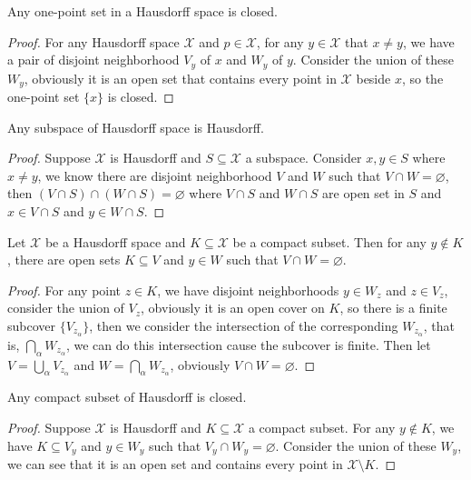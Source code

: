 \documentclass[./main.tex]{subfiles}
\begin{document}
\begin{corollary}
  Any one-point set in a Hausdorff space is closed.
\end{corollary}
\begin{proof}
  For any Hausdorff space $\mathcal{X}$ and $p \in \mathcal{X}$,
  for any $y \in \mathcal{X}$ that $x \neq y$, we have a pair of disjoint neighborhood
  $V_y$ of $x$ and $W_y$ of $y$. Consider the union of these $W_y$,
  obviously it is an open set that contains every point in $\mathcal{X}$ beside $x$,
  so the one-point set $\{ x \}$ is closed.
\end{proof}

\begin{corollary}
  Any subspace of Hausdorff space is Hausdorff.
\end{corollary}
\begin{proof}
  Suppose $\mathcal{X}$ is Hausdorff and $S \subseteq \mathcal{X}$ a subspace.
  Consider $x, y \in S$ where $x \neq y$, we know there are disjoint neighborhood 
  $V$ and $W$ such that $V \cap W = \varnothing$, then $(V \cap S) \cap (W \cap S) = \varnothing$
  where $V \cap S$ and $W \cap S$ are open set in $S$ and $x \in V \cap S$ and $y \in W \cap S$.
\end{proof}

\begin{theorem}
  \label{theorem:1.3}
  Let $\mathcal{X}$ be a Hausdorff space and $K \subseteq \mathcal{X}$ be a compact subset.
  Then for any $y \notin K$, there are open sets $K \subseteq V$ and $y \in W$
  such that $V \cap W = \varnothing$.
\end{theorem}
\begin{proof}
  For any point $z \in K$, we have disjoint neighborhoods $y \in W_z$ and $z \in V_z$,
  consider the union of $V_z$, obviously it is an open cover on $K$, so there is
  a finite subcover $\{ V_{z_\alpha} \}$, then we consider the intersection of the corresponding
  $W_{z_\alpha}$, that is, $\bigcap_\alpha W_{z_\alpha}$, we can do this intersection
  cause the subcover is finite.
  Then let $V = \bigcup_\alpha V_{z_\alpha}$ and $W = \bigcap_\alpha W_{z_\alpha}$,
  obviously $V \cap W = \varnothing$.
\end{proof}

\begin{theorem}
  Any compact subset of Hausdorff is closed.
\end{theorem}
\begin{proof}
  Suppose $\mathcal{X}$ is Hausdorff and $K \subseteq \mathcal{X}$ a compact subset.
  For any $y \notin K$, we have $K \subseteq V_y$ and $y \in W_y$ such that $V_y \cap W_y = \varnothing$.
  Consider the union of these $W_y$, we can see that it is an open set and contains every point
  in $\mathcal{X} \setminus K$.
\end{proof}
\end{document}
